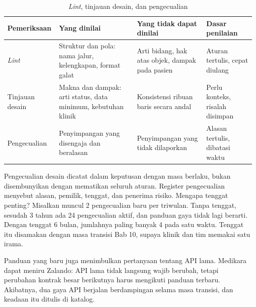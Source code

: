 \begin{table}[!htb]
  \centering
  \caption{\textit{Lint}, tinjauan desain, dan pengecualian}
  \label{tab:ch13-lint-tinjauan}
  \footnotesize
  \begin{tabularx}{\textwidth}{H{2.3cm}GGH{2.9cm}}
    \hline
    \textbf{Pemeriksaan} & \textbf{Yang dinilai} & \textbf{Yang tidak dapat dinilai} & \textbf{Dasar penilaian} \\ \hline
    \textit{Lint} & Struktur dan pola: nama jalur, kelengkapan, format galat & Arti bidang, hak atas objek, dampak pada pasien & Aturan tertulis, cepat diulang \\ \hline
    Tinjauan desain & Makna dan dampak: arti status, data minimum, kebutuhan klinik & Konsistensi ribuan baris secara andal & Perlu konteks, risalah disimpan \\ \hline
    Pengecualian & Penyimpangan yang disengaja dan beralasan & Penyimpangan yang tidak dilaporkan & Alasan tertulis, dibatasi waktu \\ \hline
  \end{tabularx}
\end{table}

Pengecualian desain dicatat dalam keputusan dengan masa berlaku, bukan disembunyikan dengan mematikan seluruh aturan. Register pengecualian menyebut
alasan, pemilik, tenggat, dan penerima risiko. Mengapa tenggat penting? Misalkan muncul 2 pengecualian baru per triwulan. Tanpa tenggat, sesudah 3 tahun ada
24 pengecualian aktif, dan panduan gaya tidak lagi berarti. Dengan tenggat 6 bulan, jumlahnya paling banyak 4 pada satu waktu. Tenggat itu disamakan dengan
masa transisi Bab 10, supaya klinik dan tim memakai satu irama.

Panduan yang baru juga menimbulkan pertanyaan tentang API lama. Medikara dapat meniru Zalando: API lama tidak langsung wajib berubah, tetapi perubahan kontrak
besar berikutnya harus mengikuti panduan terbaru. Akibatnya, dua gaya API berjalan berdampingan selama masa transisi, dan keadaan itu ditulis di katalog.

